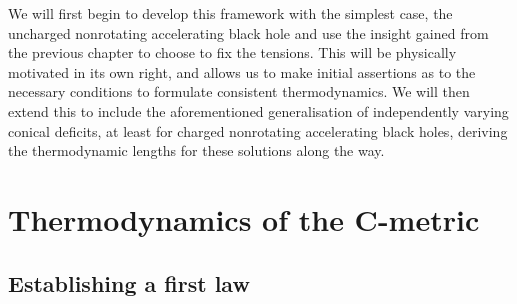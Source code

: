 \documentclass[
twoside,
openright,
frontopenright,
]{dmathesis}
\begin{document}
We will first begin to develop this framework with the simplest case, the
uncharged nonrotating accelerating black hole and use the insight gained from
the previous chapter to choose to fix the tensions. This will be physically
motivated in its own right, and allows us to make initial assertions as to the
necessary conditions to formulate consistent thermodynamics. We will then extend
this to include the aforementioned generalisation of independently varying
conical deficits, at least for charged nonrotating accelerating black holes,
deriving the thermodynamic lengths for these solutions along the way.

\section{Thermodynamics of the C-metric}

\subsection{Establishing a first law}
\end{document}
